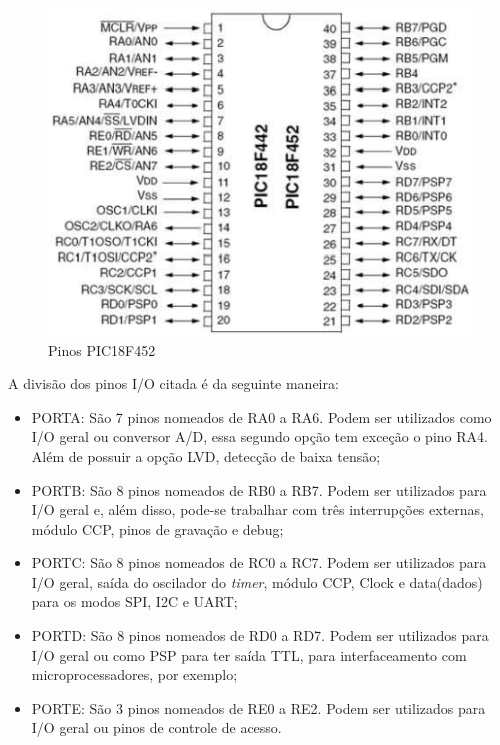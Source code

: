 \begin{figure}[htp]
	\centering
	\includegraphics[scale=0.6]{images/pinos_pic.png}
	\caption{Pinos PIC18F452}	
	\label{fig:pinospic}	
\end{figure}

A divisão dos pinos I/O citada é da seguinte maneira:

\begin{itemize}
\item PORTA: São 7 pinos nomeados de RA0 a RA6. Podem ser utilizados como I/O geral ou conversor A/D, essa segundo opção tem exceção o pino RA4. Além de possuir a opção LVD, detecção de baixa tensão;
\item PORTB: São 8 pinos nomeados de RB0 a RB7. Podem ser utilizados para I/O geral e, além disso, pode-se trabalhar com três interrupções externas, módulo CCP, pinos de gravação e debug;
\item PORTC: São 8 pinos nomeados de RC0 a RC7. Podem ser utilizados para I/O geral, saída do oscilador do \emph{timer}, módulo CCP, Clock e data(dados) para os modos SPI, I2C e UART;
\item PORTD: São 8 pinos nomeados de RD0 a RD7. Podem ser utilizados para I/O geral ou como PSP para ter saída TTL, para interfaceamento com microprocessadores, por exemplo;
\item PORTE: São 3 pinos nomeados de RE0 a RE2. Podem ser utilizados para I/O geral ou pinos de controle de acesso.
\end{itemize}